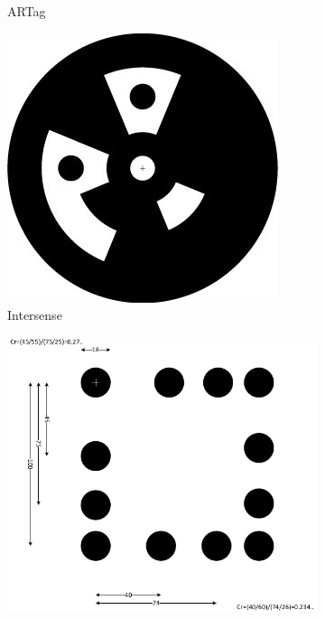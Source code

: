 \documentclass[runningheads]{llncs}
\begin{document}
\begin{figure}
\begin{subfigure}[b]{0.19\textwidth}
  \caption{ARTag}
 \end{subfigure}
 \begin{subfigure}[b]{0.19\textwidth}
  \centering
  \includegraphics[width=\linewidth]{intersense.jpg}
  \caption{Intersense}  
 \end{subfigure}
 \begin{subfigure}[b]{0.19\textwidth}
  \centering
  \includegraphics[width=\linewidth]{pifiducial.png}

\end{subfigure}
\end{figure}
\end{document}
